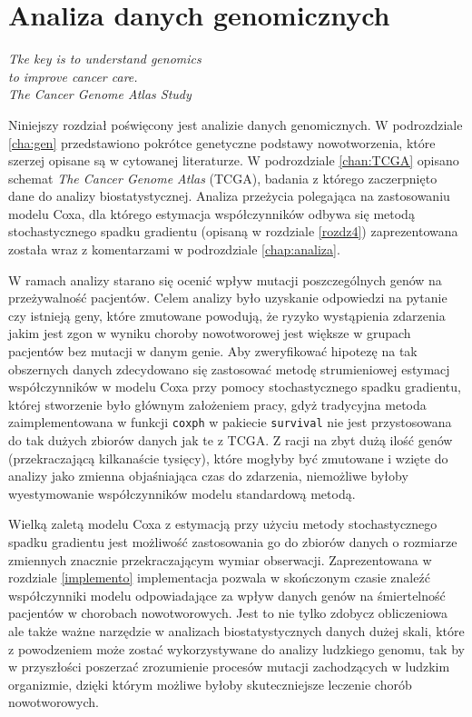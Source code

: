 \chapter{Analiza danych genomicznych}\label{chap5}
\begin{flushright}
\textit{Tke key is to understand genomics \\
to improve cancer care. \\
The Cancer Genome Atlas Study
}
\end{flushright}

Niniejszy rozdział poświęcony jest analizie danych genomicznych. W podrozdziale \ref{cha:gen} przedstawiono pokrótce genetyczne podstawy nowotworzenia, które szerzej opisane są w cytowanej literaturze. W podrozdziale \ref{chan:TCGA} opisano schemat \textit{The Cancer Genome Atlas} (TCGA), badania z którego zaczerpnięto dane do analizy biostatystycznej. Analiza przeżycia polegająca na zastosowaniu modelu Coxa, dla którego estymacja współczynników odbywa się metodą stochastycznego spadku gradientu (opisaną w rozdziale \ref{rozdz4}) zaprezentowana została wraz z komentarzami w podrozdziale \ref{chap:analiza}. 

W ramach analizy starano się ocenić wpływ mutacji poszczególnych genów na przeżywalność pacjentów. Celem analizy było uzyskanie odpowiedzi na pytanie czy istnieją geny, które zmutowane powodują, że ryzyko wystąpienia zdarzenia jakim jest zgon w wyniku choroby nowotworowej jest większe w grupach pacjentów bez mutacji w danym genie. Aby zweryfikować hipotezę na tak obszernych danych zdecydowano się zastosować metodę strumieniowej estymacj współczynników w modelu Coxa przy pomocy stochastycznego spadku gradientu, której stworzenie było głównym założeniem pracy, gdyż tradycyjna metoda zaimplementowana w funkcji \texttt{coxph} w pakiecie \texttt{survival} \cite{survival} nie jest przystosowana do tak dużych zbiorów danych jak te z TCGA. Z racji na zbyt dużą ilość genów (przekraczającą kilkanaście tysięcy), które mogłyby być zmutowane i wzięte do analizy jako zmienna objaśniająca czas do zdarzenia, niemożliwe byłoby wyestymowanie współczynników modelu standardową metodą.

Wielką zaletą modelu Coxa z estymacją przy użyciu metody stochastycznego spadku gradientu jest możliwość zastosowania go do zbiorów danych o rozmiarze zmiennych znacznie przekraczającym wymiar obserwacji. Zaprezentowana w rozdziale \ref{implemento} implementacja pozwala w skończonym czasie znaleźć współczynniki modelu odpowiadające za wpływ danych genów na śmiertelność pacjentów w chorobach nowotworowych. Jest to nie tylko zdobycz obliczeniowa ale także ważne narzędzie w analizach biostatystycznych danych dużej skali, które z powodzeniem może zostać wykorzystywane do analizy ludzkiego genomu, tak by w przyszłości poszerzać zrozumienie procesów mutacji zachodzących w ludzkim organizmie, dzięki którym możliwe byłoby skuteczniejsze leczenie chorób nowotworowych.
\newpage
